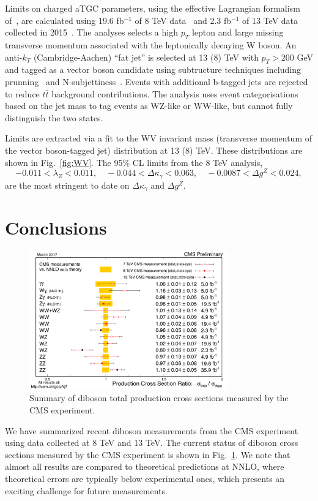 \documentclass[10pt]{article}
\begin{document}
Limits on charged aTGC parameters, using the effective Lagrangian formalism 
of~\cite{Hagiwara:1993ck}, are calculated using 19.6 fb$^{-1}$ of 8 TeV 
data~\cite{Sirunyan:2017bey}
and 2.3 fb$^{-1}$ of 13 TeV data collected in 2015~\cite{CMS:2016djf}.
The analyses selects a high $p_{T}$ lepton and large missing transverse momentum
associated with the leptonically decaying W boson. An anti-$k_{T}$
(Cambridge-Aachen) ``fat jet''  is selected at 13 (8) TeV with $p_{T} > 200$ GeV 
and tagged as a vector boson candidate using
subtructure techniques including prunning~\cite{Ellis:2009me} and 
N-subjettiness~\cite{Thaler:2010tr}. 
Events with additional b-tagged jets are 
rejected to reduce $t\bar{t}$ background contributions. The analysis uses event categorisations
based on the jet mass to tag events as WZ-like or WW-like, but cannot fully 
distinguish the two states.

Limits are extracted via a fit to the WV invariant mass (transverse momentum of the vector boson-tagged jet) 
distribution at 13 (8) TeV.
These distributions are shown in Fig.~\ref{fig:WV}.
The 95\% CL limits from the 8 TeV analysis,
\begin{equation}
  -0.011 < \lambda_{Z} < 0.011, \quad -0.044 < \Delta\kappa_{\gamma} < 0.063, \quad -0.0087 < \Delta g^{Z} < 0.024,
\end{equation}
are the most stringent to date on $\Delta\kappa_\gamma$ and $\Delta g^{Z}$.

\section{Conclusions}
\begin{figure}[htb]
  \centering
    \includegraphics[height=2.35in]{figures/CrossSectionSummary.pdf}
  \caption{ Summary of diboson total production cross sections measured by the CMS experiment. }
  \label{fig:xsecs}
\end{figure}


We have summarized recent diboson measurements from the CMS experiment using
data collected at 8 TeV and 13 TeV. The current status of diboson cross sections 
measured by the CMS experiment is shown in Fig.~\ref{fig:xsecs}. We note that 
almost all results are compared to theoretical predictions at NNLO, where theoretical 
errors are typically below experimental ones, which 
presents an exciting challenge
for future measurements. 



\end{document}
